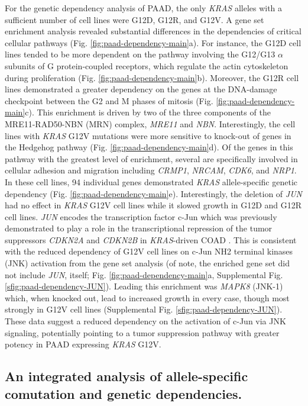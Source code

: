 \documentclass[english, 10pt, letterpaper]{article}
\newcommand{\KRAS}{\emph{KRAS}}
\begin{document}
For the genetic dependency analysis of PAAD, the only \KRAS{} alleles with a sufficient number of cell lines were G12D, G12R, and G12V.
A gene set enrichment analysis revealed substantial differences in the dependencies of critical cellular pathways (Fig. \ref{fig:paad-dependency-main}a).
For instance, the G12D cell lines tended to be more dependent on the pathway involving the G12/G13 $\alpha$ subunits of G protein-coupled receptors, which regulate the actin cytoskeleton during proliferation \cite{Worzfeld2008G12/G13-mediatedDisease., Siehler2009RegulationReceptors., Suzuki2009RegulationPathways.} (Fig. \ref{fig:paad-dependency-main}b).
Moreover, the G12R cell lines demonstrated a greater dependency on the genes at the DNA-damage checkpoint between the G2 and M phases of mitosis (Fig. \ref{fig:paad-dependency-main}c).
This enrichment is driven by two of the three components of the MRE11-RAD50-NBN (MRN) complex, \emph{MRE11} and \emph{NBN}.
Interestingly, the cell lines with \KRAS{} G12V mutations were more sensitive to knock-out of genes in the Hedgehog pathway (Fig. \ref{fig:paad-dependency-main}d).
Of the genes in this pathway with the greatest level of enrichment, several are specifically involved in cellular adhesion and migration including \emph{CRMP1}, \emph{NRCAM}, \emph{CDK6}, and \emph{NRP1}.
In these cell lines, 94 individual genes demonstrated \KRAS{} allele-specific genetic dependency (Fig. \ref{fig:paad-dependency-main}e).
Interestingly, the deletion of \emph{JUN} had no effect in \KRAS{} G12V cell lines while it slowed growth in G12D and G12R cell lines.
\emph{JUN} encodes the transcription factor c-Jun which was previously demonstrated to play a role in the transcriptional repression of the tumor suppressors \emph{CDKN2A} and \emph{CDKN2B} in \KRAS{}-driven COAD \cite{Serra2014APhenotype.}.
This is consistent with the reduced dependency of G12V cell lines on c-Jun NH2 terminal kinases (JNK) activation from the gene set analysis (of note, the enriched gene set did not include \emph{JUN}, itself; Fig. \ref{fig:paad-dependency-main}a, Supplemental Fig. \ref{sfig:paad-dependency-JUN}).
Leading this enrichment was \emph{MAPK8} (JNK-1) which, when knocked out, lead to increased growth in every case, though most strongly in G12V cell lines (Supplemental Fig. \ref{sfig:paad-dependency-JUN}).
These data suggest a reduced dependency on the activation of c-Jun via JNK signaling, potentially pointing to a tumor suppression pathway with greater potency in PAAD expressing \KRAS{} G12V.


\subsection*{An integrated analysis of allele-specific comutation and genetic dependencies.}
\end{document}
